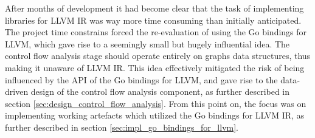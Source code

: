 After months of development it had become clear that the task of implementing libraries for LLVM IR was way more time consuming than initially anticipated. The project time constrains forced the re-evaluation of using the Go bindings for LLVM, which gave rise to a seemingly small but hugely influential idea. The control flow analysis stage should operate entirely on graphs data structures, thus making it unaware of LLVM IR. This idea effectively mitigated the risk of being influenced by the API of the Go bindings for LLVM, and gave rise to the data-driven design of the control flow analysis component, as further described in section \ref{sec:design_control_flow_analysis}. From this point on, the focus was on implementing working artefacts which utilized the Go bindings for LLVM IR, as further described in section \ref{sec:impl_go_bindings_for_llvm}.
